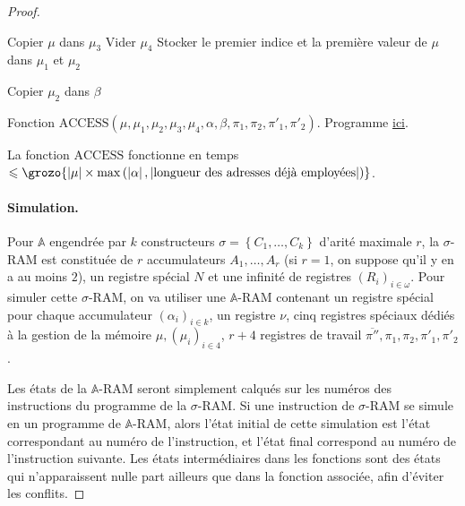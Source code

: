 \documentclass{report}
\newcommand{\bbA}{\mathbb{A}}
\begin{document}
\begin{proof}
\begin{algorithm}[H]
						
						Copier $\mu$ dans $\mu_3$ \;
						Vider $\mu_4$ \;
						Stocker le premier indice et la première valeur de $\mu$ dans $\mu_1$ et $\mu_2$ \;
						
						\espace
						
						
						
						
						Copier $\mu_2$ dans $\beta$ \;
						
						\caption{Fonction $\text{ACCESS}\left( \mu, \mu_1, \mu_2, \mu_3, \mu_4, \alpha, \beta, \pi_1, \pi_2, \pi'_1, \pi'_2\right)$. Programme \hyperref[prog:A_RAM_fn_ACCESS]{ici}. }
					\end{algorithm}
					
					\espace

					La fonction $\text{ACCESS}$ fonctionne en temps $\leqslant \grozo{\left| \mu \right| \times \max\left( \left| \alpha \right| , \left| \text{longueur des adresses déjà employées} \right| \right) }$.
					
					\paragraph{Simulation.}
					\label{par:sim_sigma_RAM_A_RAM}
					Pour $\bbA$ engendrée par $k$ constructeurs $\sigma = \left\lbrace C_1, \dots, C_k\right\rbrace$ d'arité maximale $r$, la $\sigma$-RAM est constituée de $r$ accumulateurs $A_1, \dots, A_r$ (si $r = 1$, on suppose qu'il y en a au moins $2$), un registre spécial $N$ et une infinité de registres $(R_i)_{i \in \omega}$. Pour simuler cette $\sigma$-RAM, on va utiliser une $\bbA$-RAM contenant un registre spécial pour chaque accumulateur $(\alpha_i)_{i \in k}$, un registre $\nu$, cinq registres spéciaux dédiés à la gestion de la mémoire $\mu, (\mu_i)_{i \in 4}$, $r+4$ registres de travail $\overline{\pi''}, \pi_1, \pi_2, \pi'_1, \pi'_2$.
					
					Les états de la $\bbA$-RAM seront simplement calqués sur les numéros des instructions du programme de la $\sigma$-RAM. Si une instruction de $\sigma$-RAM se simule en un programme de $\bbA$-RAM, alors l'état initial de cette simulation est l'état correspondant au numéro de l'instruction, et l'état final correspond au numéro de l'instruction suivante. Les états intermédiaires dans les fonctions sont des états qui n'apparaissent nulle part ailleurs que dans la fonction associée, afin d'éviter les conflits. 
						

\end{proof}
\end{document}
